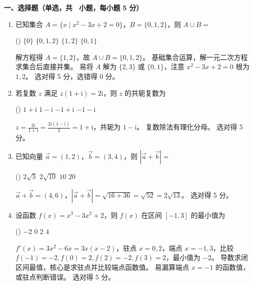 \noindent\textbf{一、选择题（单选，共 \mcqCount\ 小题，每小题 5 分）}
\vspace{0.3em}
\begin{enumerate}[itemsep=\mcqItemSep]
    \item 已知集合 $A=\{x \mid x^2-3x+2=0\}$，$B=\{0,1,2\}$，则 $A \cup B =$
    \begin{tasks}(\mcqTasksCols)
        \task $\{0\}$
        \task $\{0,1,2\}$
        \task $\{1,2\}$
        \task $\{0,1\}$
    \end{tasks}
    \begin{solution}
        \jieti 解方程得 $A=\{1,2\}$，故 $A\cup B=\{0,1,2\}$。
        \xijie 基础集合运算，解一元二次方程求集合后直接并集。
        \cuowu 易将 $A$ 解为 $\{2,3\}$ 或 $\{0,1\}$，注意 $x^2-3x+2=0$ 根为 $1,2$。
        \pingfen 选对得 5 分，选错得 0 分。
    \end{solution}

    \item 若复数 $z$ 满足 $z(1+\mathrm{i})=2\mathrm{i}$，则 $z$ 的共轭复数为
    \begin{tasks}(\mcqTasksCols)
        \task $1+\mathrm{i}$
        \task $1-\mathrm{i}$
        \task $-1+\mathrm{i}$
        \task $-1-\mathrm{i}$
    \end{tasks}
    \begin{solution}
        \jieti $z=\frac{2\mathrm{i}}{1+\mathrm{i}}=\frac{2\mathrm{i}(1-\mathrm{i})}{2}=1+\mathrm{i}$，共轭为 $1-\mathrm{i}$。
        \xijie 复数除法有理化分母。
        \pingfen 选对得 5 分。
    \end{solution}

    \item 已知向量 $\vec{a}=(1,2)$，$\vec{b}=(3,4)$，则 $|\vec{a}+\vec{b}|=$
    \begin{tasks}(\mcqTasksCols)
        \task $2\sqrt{5}$
        \task $2\sqrt{10}$
        \task $10$
        \task $20$
    \end{tasks}
    \begin{solution}
        \jieti $\vec{a}+\vec{b}=(4,6)$，$|\vec{a}+\vec{b}|=\sqrt{16+36}=\sqrt{52}=2\sqrt{13}$。
        \pingfen 选对得 5 分。
    \end{solution}

    \item 设函数 $f(x)=x^3-3x^2+2$，则 $f(x)$ 在区间 $[-1,3]$ 的最小值为
    \begin{tasks}(\mcqTasksCols)
        \task $-2$
        \task $0$
        \task $2$
        \task $4$
    \end{tasks}
    \begin{solution}
        \jieti $f'(x)=3x^2-6x=3x(x-2)$，驻点 $x=0,2$，端点 $x=-1,3$，比较 $f(-1)=-2, f(0)=2, f(2)=-2, f(3)=2$，最小值为 $-2$。
        \xijie 导数求闭区间最值，核心是求驻点并比较端点函数值。
        \cuowu 易漏算端点 $x=-1$ 的函数值，或驻点判断错误。
        \pingfen 选对得 5 分。
    \end{solution}
\end{enumerate}

